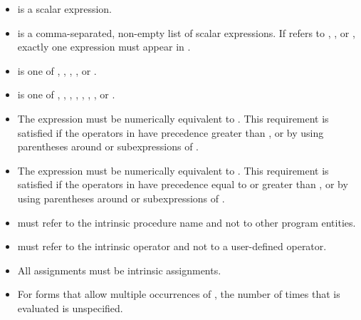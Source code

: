 \begin{fortranspecific}
\begin{itemize}
\vspace{-2 pt} %
\item {} is a scalar expression.

\vspace{-2 pt} %
\item {} is a comma-separated, non-empty list of scalar expressions. If
 refers to , , or , exactly one expression
must appear in .

\vspace{-2 pt} %
\item {} is one of , , , , or .

\vspace{-2 pt} %
\item {} is one of \code{+}, \code{*}, \code{-}, \code{/}, , , , or .

\vspace{-2 pt} %
\item The expression  must be numerically equivalent to .
This requirement is satisfied if the operators in  have precedence greater than
, or by using parentheses around  or subexpressions of .

\vspace{-2 pt} %
\item The expression  must be numerically equivalent to . This requirement is satisfied if the operators in  have precedence equal to or
greater than , or by using parentheses around  or subexpressions of .

\vspace{-2 pt} %
\item {} must refer to the intrinsic procedure name and not to other
program entities.

\vspace{-2 pt} %
\item {} must refer to the intrinsic operator and not to a user-defined operator.

\vspace{-2 pt} %
\item All assignments must be intrinsic assignments.

\vspace{-2 pt} %
\item For forms that allow multiple occurrences of , the number of times that  is
evaluated is unspecified.
\end{itemize}
\end{fortranspecific}
